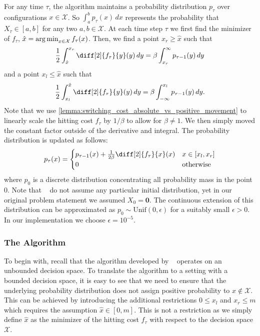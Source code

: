 For any time $\tau$, the algorithm maintains a probability distribution $p_{\tau}$ over configurations $x \in \mathcal{X}$. So $\int_a^b p_{\tau}(x) \,dx$ represents the probability that $X_{\tau} \in [a,b]$ for any two $a, b \in \mathcal{X}$. At each time step $\tau$ we first find the minimizer of $f_{\tau}$, $\hat{x} = \operatorname*{arg\,min}_{x \in \mathcal{X}} f_{\tau}(x)$. Then, we find a point $x_r \geq \hat{x}$ such that \begin{align}\label{eq:ud:probabilistic:right}
    \frac{1}{2} \int_{\hat{x}}^{x_r} \diff[2]{f_{\tau}}{y}(y) \,dy = \beta \int_{x_r}^{\infty} p_{\tau-1}(y) \,dy
\end{align} and a point $x_l \leq \hat{x}$ such that \begin{align}\label{eq:ud:probabilistic:left}
    \frac{1}{2} \int_{x_l}^{\hat{x}} \diff[2]{f_{\tau}}{y}(y) \,dy = \beta \int_{-\infty}^{x_l} p_{\tau-1}(y) \,dy.
\end{align} Note that we use \cref{lemma:switching_cost_absolute_vs_positive_movement} to linearly scale the hitting cost $f_{\tau}$ by $1 / \beta$ to allow for $\beta \neq 1$. We then simply moved the constant factor outside of the derivative and integral. The probability distribution is updated as follows: \begin{align}\label{eq:ud:probabilistic:update}
    p_{\tau}(x) = \begin{cases}
        p_{\tau-1}(x) + \frac{1}{2 \beta} \diff[2]{f_{\tau}}{x}(x) & x \in [x_l,x_r] \\
        0 & \text{otherwise}
    \end{cases}
\end{align} where $p_0$ is a discrete distribution concentrating all probability mass in the point $0$. Note that \citeauthor{Bansal2015}~\cite{Bansal2015} do not assume any particular initial distribution, yet in our original problem statement we assumed $X_0 = \mathbf{0}$. The continuous extension of this distribution can be approximated as $p_0 \sim \text{Unif}(0, \epsilon)$ for a suitably small $\epsilon > 0$. In our implementation we choose $\epsilon = 10^{-5}$.

\subsubsection{The Algorithm}

To begin with, recall that the algorithm developed by \citeauthor{Bansal2015}~\cite{Bansal2015} operates on an unbounded decision space. To translate the algorithm to a setting with a bounded decision space, it is easy to see that we need to ensure that the underlying probability distribution does not assign positive probability to $x \not\in \mathcal{X}$. This can be achieved by introducing the additional restrictions $0 \leq x_l$ and $x_r \leq m$ which requires the assumption $\hat{x} \in [0,m]$. This is not a restriction as we simply define $\hat{x}$ as the minimizer of the hitting cost $f_{\tau}$ with respect to the decision space $\mathcal{X}$.

